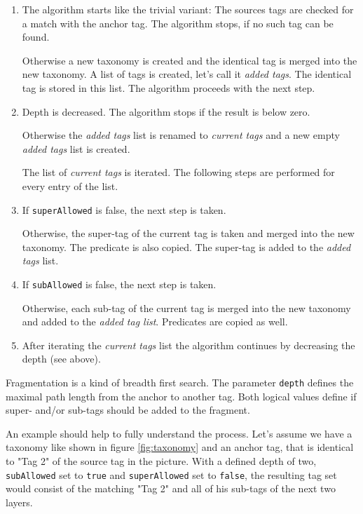 \begin{enumerate}
    \item
The algorithm starts like the trivial variant: The sources tags are checked for a match with the anchor tag. The algorithm stops, if no such tag can be found.

Otherwise a new taxonomy is created and the identical tag is merged into the new taxonomy. A list of tags is created, let's call it {\it added tags}. The identical tag is stored in this list. The algorithm proceeds with the next step.

    \item
Depth is decreased. The algorithm stops if the result is below zero.

Otherwise the {\it added tags} list is renamed to {\it current tags} and a new empty {\it added tags} list is created.

The list of {\it current tags} is iterated. The following steps are performed for every entry of the list.

    \item
If {\tt superAllowed} is false, the next step is taken.

Otherwise, the super-tag of the current tag is taken and merged into the new taxonomy. The predicate is also copied. The super-tag is added to the {\it added tags} list.

    \item
If {\tt subAllowed} is false, the next step is taken.

Otherwise, each sub-tag of the current tag is merged into the new taxonomy and added to the {\it added tag list}. Predicates are copied as well.

    \item
After iterating the {\it current tags} list the algorithm continues by decreasing the depth (see above).

\end{enumerate}

Fragmentation is a kind of breadth first search. The parameter {\tt depth} defines the maximal path length from the anchor to another tag. Both logical values define if super- and/or sub-tags should be added to the fragment.

An example should help to fully understand the process. Let's assume we have a taxonomy like shown in figure \ref{fig:taxonomy} and an anchor tag, that is identical to "Tag 2" of the source tag in the picture. With a defined depth of two, {\tt subAllowed} set to {\tt true} and {\tt superAllowed} set to {\tt false}, the resulting tag set would consist of the matching "Tag 2" and all of his sub-tags of the next two layers.

